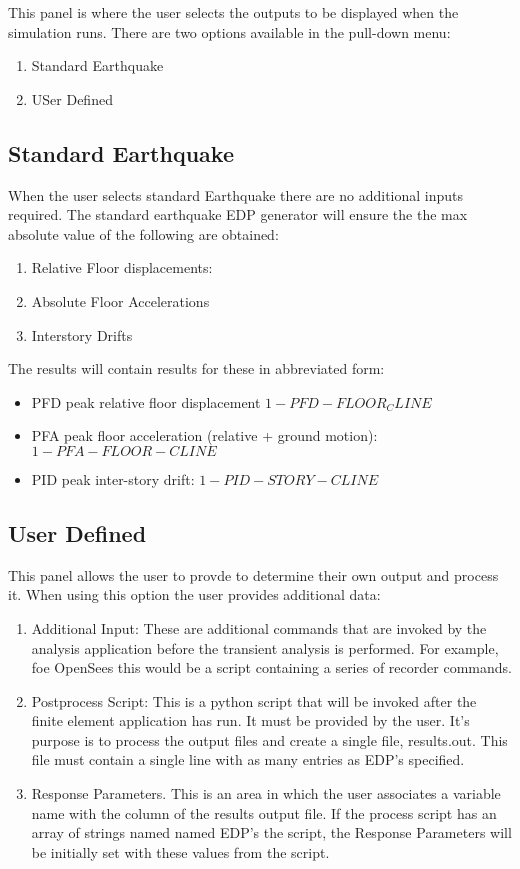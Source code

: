This panel is where the user selects the outputs to be displayed when the simulation runs. There are two options available in the pull-down menu:
\begin{enumerate}
\item Standard Earthquake
\item USer Defined
\end{enumerate}

\subsection{Standard Earthquake}
When the user selects standard Earthquake there are no additional inputs required. The standard earthquake EDP generator will ensure the the max absolute value of the following are obtained: \begin{enumerate}
\item Relative Floor displacements:
\item Absolute Floor Accelerations
\item Interstory Drifts
\end{enumerate}

The  results will contain results for these in abbreviated form:
\begin{itemize}
\item PFD peak relative floor displacement $1-PFD-FLOOR_CLINE$
\item PFA peak floor acceleration (relative + ground motion): $1-PFA-FLOOR-CLINE$
\item PID peak inter-story drift: $1-PID-STORY-CLINE$
\end{itemize}

\subsection{User Defined}
This panel allows the user to provde to determine their own output and process it. When using this option the user provides additional data:
\begin{enumerate}
\item Additional Input: These are additional commands that are invoked by the analysis application before the transient analysis is performed. For example, foe OpenSees this would be a script containing a series of recorder commands.
\item Postprocess Script: This is a python script that will be invoked after the finite element application has run. It must be provided by the user. It's purpose is to process the output files and create a single file, results.out. This file must contain a single line with as many entries as EDP's specified.

\item Response Parameters. This is an area in which the user associates a variable name with the column of the results output file. If the process script has an array of strings named named EDP's the script, the Response Parameters will be initially set with these values from the script.
\end{enumerate}

